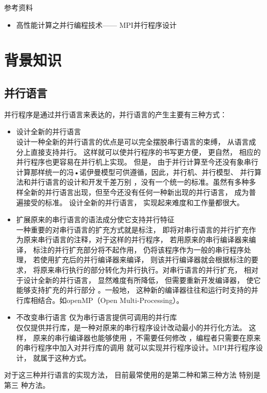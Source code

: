 参考资料
\begin{itemize}
\item  高性能计算之并行编程技术—— MPI并行程序设计
\end{itemize}
\chapter{背景知识}
\section{并行语言}
并行程序是通过并行语言来表达的，并行语言的产生主要有三种方式：
\begin{itemize}
\item 设计全新的并行语言\\
设计一种全新的并行语言的优点是可以完全摆脱串行语言的束缚， 从语言成分上直接支持并行。 这样就可以使并行程序的书写更方便， 更自然， 相应的并行程序也更容易在并行机上实现。 但是， 由于并行计算至今还没有象串行计算那样统一的冯•诺伊曼模型可供遵循，因此，并行机、并行模型、 并行算法和并行语言的设计和开发千差万别 ，没有一个统一的标准。虽然有多种多样全新的并行语言出现，但至今还没有任何一种新出现的并行语言， 成为普遍接受的标准。 设计全新的并行语言， 实现起来难度和工作量都很大。
\item 扩展原来的串行语言的语法成分使它支持并行特征\\
一种重要的对串行语言的扩充方式就是标注， 即将对串行语言的并行扩充作为原来串行语言的注释，对于这样的并行程序， 若用原来的串行编译器来编译， 标注的并行扩充部分将不起作用， 仍将该程序作为一般的串行程序处理， 若使用扩充后的并行编译器来编译， 则该并行编译器就会根据标注的要求， 将原来串行执行的部分转化为并行执行。对串行语言的并行扩充， 相对于设计全新的并行语言， 显然难度有所降低， 但需要重新开发编译器， 使它能够支持扩充的并行部分 。一般地， 这种新的编译器往往和运行时支持的并行库相结合。如openMP（Open Multi-Processing）。
\item 不改变串行语言 仅为串行语言提供可调用的并行库\\
仅仅提供并行库，是一种对原来的串行程序设计改动最小的并行化方法。 这样， 原来的串行编译器也能够使用 ，不需要任何修改 ，编程者只需要在原来的串行程序中加入对并行库的调用 就可以实现并行程序设计。MPI并行程序设计， 就属于这种方式。
\end{itemize}  
对于这三种并行语言的实现方法， 目前最常使用的是第二种和第三种方法 特别是第三
种方法。



%
%

